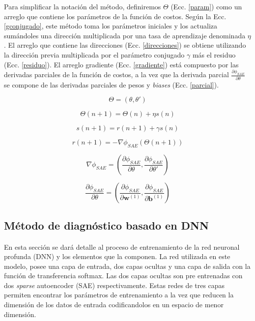 \documentclass[12pt]{article}%
\begin{document}
Para simplificar la notación del método, definiremos $\Theta$ (Ecc. \ref{param}) como un arreglo que contiene los parámetros de la función de costos. Según la Ecc. \ref{gconjugado}, este método toma los parámetros iniciales y los actualiza sumándoles una dirección multiplicada por una tasa de aprendizaje denominada $\eta$. El arreglo que contiene las direcciones (Ecc. \ref{direcciones}) se obtiene utilizando la dirección previa multiplicada por el parámetro conjugado $\gamma$ más el residuo (Ecc. \ref{residuo}). El arreglo gradiente (Ecc. \ref{gradiente}) está compuesto por las derivadas parciales de la función de costos, a la vez que la derivada parcial $\frac{\partial{\phi_{SAE}}}{\partial{\theta}}$ se compone de las derivadas parciales de pesos y \textit{biases} (Ecc. \ref{parcial}).

\begin{equation}
\label{param}
\Theta = (\theta,\theta')
\end{equation} 

\begin{equation}
\label{gconjugado}
\Theta(n+1)=\Theta(n)+{\eta}s(n)
\end{equation}

\begin{equation}
\label{direcciones}
s(n+1)=r(n+1)+\gamma{s(n)}
\end{equation} 

\begin{equation}
\label{residuo}
r(n+1) = -\nabla{\phi_{SAE}(\Theta(n+1))}
\end{equation} 

\begin{equation}
\label{gradiente}
\nabla{\phi_{SAE}} = \left(\frac{\partial{\phi_{SAE}}}{\partial{\theta}},\frac{\partial{\phi_{SAE}}}{\partial{\theta'}}\right)
\end{equation}

\begin{equation}
\label{parcial}
\frac{\partial{\phi_{SAE}}}{\partial{\theta}} = \left(\frac{\partial{\phi_{SAE}}}{\partial{\textbf{w}^{(1)}}},\frac{\partial{\phi_{SAE}}}{\partial{\textbf{b}^{(1)}}}\right)
\end{equation}  
\subsection{Método de diagnóstico basado en DNN}
\label{sec:training}

\paragraph{}
En esta sección se dará detalle al proceso de entrenamiento de la red neuronal profunda (DNN) y los elementos que la componen. La red utilizada en este modelo, posee una capa de entrada, dos capas ocultas y una capa de salida con la función de transferencia softmax. Las dos capas ocultas son pre entrenadas con dos \textit{sparse} autoencoder (SAE) respectivamente. Estas redes de tres capas permiten encontrar los parámetros de entrenamiento a la vez que reducen la dimensión de los datos de entrada codificandolos en un espacio de menor dimensión. 
\end{document}
